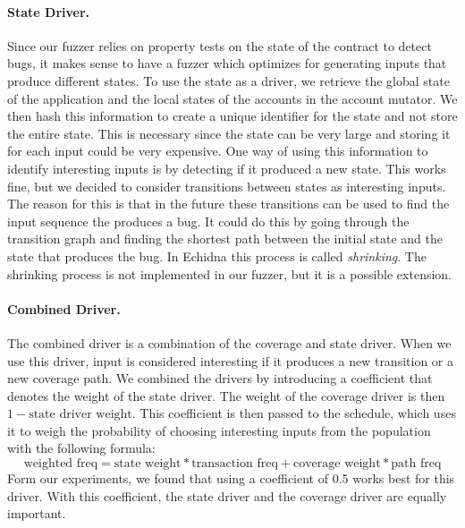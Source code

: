 \paragraph{State Driver.}
Since our fuzzer relies on property tests on the state of the contract to detect bugs, it makes sense to have a fuzzer which optimizes for generating inputs that produce different states.
To use the state as a driver, we retrieve the global state of the application and the local states of the accounts in the account mutator.
We then hash this information to create a unique identifier for the state and not store the entire state.
This is necessary since the state can be very large and storing it for each input could be very expensive.
One way of using this information to identify interesting inputs is by detecting if it produced a new state.
This works fine, but we decided to consider transitions between states as interesting inputs.
The reason for this is that in the future these transitions can be used to find the input sequence the produces a bug.
It could do this by going through the transition graph and finding the shortest path between the initial state and the state that produces the bug.
In Echidna this process is called \textit{shrinking}.
The shrinking process is not implemented in our fuzzer, but it is a possible extension.

\paragraph{Combined Driver.}
The combined driver is a combination of the coverage and state driver.
When we use this driver, input is considered interesting if it produces a new transition or a new coverage path.
We combined the drivers by introducing a coefficient that denotes the weight of the state driver.
The weight of the coverage driver is then $1 - \text{state driver weight}$.
This coefficient is then passed to the schedule, which uses it to weigh the probability of choosing interesting inputs from the population with the following formula:
\[\text{weighted freq} = \text{state weight} * \text{transaction freq} + \text{coverage weight} * \text{path freq}\]
Form our experiments, we found that using a coefficient of 0.5 works best for this driver.
With this coefficient, the state driver and the coverage driver are equally important.


